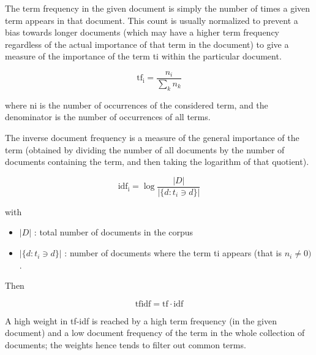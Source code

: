 \documentclass[a4paper,12pt]{article}
\begin{document}
The term frequency in the given document is simply the number of times
a given term appears in that document. This count is usually
normalized to prevent a bias towards longer documents (which may have
a higher term frequency regardless of the actual importance of that
term in the document) to give a measure of the importance of the term
ti within the particular document.

\[\mathrm{tf_i} = \frac{n_i}{\sum_k n_k}\]

where ni is the number of occurrences of the considered term, and the
denominator is the number of occurrences of all terms.

The inverse document frequency is a measure of the general importance
of the term (obtained by dividing the number of all documents by the
number of documents containing the term, and then taking the logarithm
of that quotient).

\[\mathrm{idf_i} = \log \frac{|D|}{|\{d: t_{i} \ni d\}|}\]

with
\begin{itemize}
  \item{$| D |$ : total number of documents in the corpus}
  \item{$|\{d : t_{i} \ni d\}|$  : number of documents where the term
  ti appears (that is $n_{i} \neq 0)$.}
\end{itemize}

Then

\[\mathrm{tfidf} = \mathrm{tf} \cdot \mathrm{idf}\]

A high weight in tf-idf is reached by a high term frequency (in the
given document) and a low document frequency of the term in the whole
collection of documents; the weights hence tends to filter out common
terms.
\end{document}

